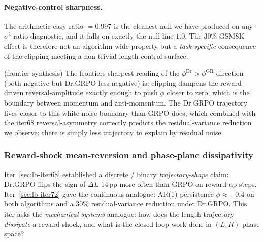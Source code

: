 \documentclass{article}
\begin{document}
\paragraph{Negative-control sharpness.}
The arithmetic-easy ratio $= 0.997$ is the cleanest null we have
produced on any $\sigma^2$ ratio diagnostic, and it falls on exactly
the null line $1.0$. The 30\% GSM8K effect is therefore not an
algorithm-wide property but a \emph{task-specific} consequence of the
clipping meeting a non-trivial length-control surface.

(frontier synthesis) The frontiers sharpest reading of the
$\phi^{\mathrm{Dr}} > \phi^{\mathrm{GR}}$ direction (both negative but
Dr.GRPO less negative) is: clipping dampens the reward-driven
reversal-amplitude exactly enough to push $\phi$ closer to zero, which
is the boundary between momentum and anti-momentum. The Dr.GRPO
trajectory lives closer to this white-noise boundary than GRPO does,
which combined with the iter68 reversal-asymmetry correctly predicts
the residual-variance reduction we observe: there is simply less
trajectory to explain by residual noise.
 

\subsubsection{Reward-shock mean-reversion and phase-plane dissipativity}\label{sec:lb-iter76}

Iter~\ref{sec:lb-iter68} established a discrete / binary
\emph{trajectory-shape} claim: Dr.GRPO flips the sign of $\Delta L$
14\,pp more often than GRPO on reward-up steps. Iter~\ref{sec:lb-iter72}
gave the continuous analogue: AR(1) persistence $\phi \approx -0.4$ on
both algorithms and a 30\% residual-variance reduction under
Dr.GRPO. This iter asks the \emph{mechanical-systems} analogue: how
does the length trajectory \emph{dissipate} a reward shock, and what is
the closed-loop work done in $(L, R)$ phase space?
\end{document}
